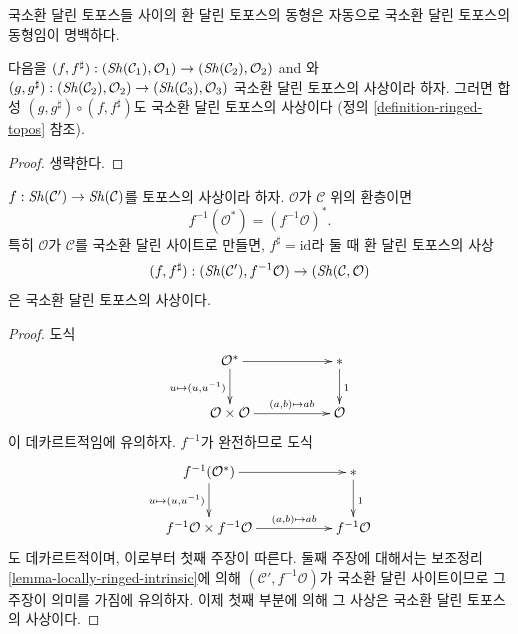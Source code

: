 \noindent
국소환 달린 토포스들 사이의 환 달린 토포스의 동형은 자동으로
국소환 달린 토포스의 동형임이 명백하다.

\begin{lemma}
\label{lemma-composition-morphisms-locally-ringed-topoi}
다음을
$(f, f^\sharp) :
(\mathop{\mathit{Sh}}\nolimits(\mathcal{C}_1), \mathcal{O}_1)
\to (\mathop{\mathit{Sh}}\nolimits(\mathcal{C}_2), \mathcal{O}_2)$ and
와
$(g, g^\sharp) :
(\mathop{\mathit{Sh}}\nolimits(\mathcal{C}_2), \mathcal{O}_2) \to
(\mathop{\mathit{Sh}}\nolimits(\mathcal{C}_3), \mathcal{O}_3)$
국소환 달린 토포스의 사상이라 하자. 그러면 합성
$(g, g^\sharp) \circ (f, f^\sharp)$도 국소환 달린 토포스의 사상이다
(정의 \ref{definition-ringed-topos} 참조).
\end{lemma}

\begin{proof}
생략한다.
\end{proof}

\begin{lemma}
\label{lemma-locally-ringed-intrinsic-morphism}
$f : \mathop{\mathit{Sh}}\nolimits(\mathcal{C}') \to \mathop{\mathit{Sh}}\nolimits(\mathcal{C})$를 토포스의 사상이라 하자.
$\mathcal{O}$가 $\mathcal{C}$ 위의 환층이면
$$
f^{-1}(\mathcal{O}^*) = (f^{-1}\mathcal{O})^*.
$$
특히 $\mathcal{O}$가 $\mathcal{C}$를 국소환 달린 사이트로 만들면,
$f^\sharp = \text{id}$라 둘 때 환 달린 토포스의 사상
$$
(f, f^\sharp) :
(\mathop{\mathit{Sh}}\nolimits(\mathcal{C}'), f^{-1}\mathcal{O})
\to
(\mathop{\mathit{Sh}}\nolimits(\mathcal{C}, \mathcal{O})
$$
은 국소환 달린 토포스의 사상이다.
\end{lemma}

\begin{proof}
도식
$$
\xymatrix{
\mathcal{O}^* \ar[rr] \ar[d]_{u \mapsto (u, u^{-1})} & &
{*} \ar[d]^{1} \\
\mathcal{O} \times \mathcal{O} \ar[rr]^-{(a, b) \mapsto ab} & &
\mathcal{O}
}
$$
이 데카르트적임에 유의하자. $f^{-1}$가 완전하므로 도식
$$
\xymatrix{
f^{-1}(\mathcal{O}^*)
\ar[d]_{u \mapsto (u, u^{-1})} \ar[rr] & &
{*} \ar[d]^{1} \\
f^{-1}\mathcal{O} \times f^{-1}\mathcal{O} \ar[rr]^-{(a, b) \mapsto ab} & &
f^{-1}\mathcal{O}
}
$$
도 데카르트적이며, 이로부터 첫째 주장이 따른다. 둘째 주장에 대해서는
보조정리 \ref{lemma-locally-ringed-intrinsic}에 의해
$(\mathcal{C}', f^{-1}\mathcal{O})$가 국소환 달린 사이트이므로 그 주장이
의미를 가짐에 유의하자. 이제 첫째 부분에 의해 그 사상은 국소환 달린
토포스의 사상이다.
\end{proof}

